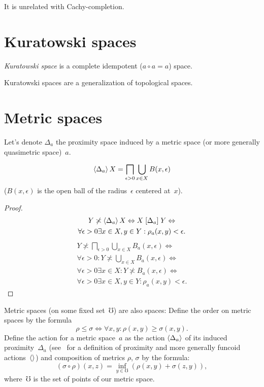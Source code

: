 \begin{note}
It is unrelated with Cachy-completion.
\end{note}

\chapter{Kuratowski spaces}

\begin{defn}
\emph{Kuratowski space} is a complete idempotent ($a\circ a=a$) space.
\end{defn}

Kuratowski spaces are a generalization of topological spaces.

\chapter{Metric spaces}

Let's denote $\Delta_a$ the proximity space induced by a metric space (or more generally quasimetric space)~$a$.

\begin{thm}
\[ \left\langle \Delta_a\right\rangle X = \bigsqcap_{\epsilon>0}\bigcup_{x\in X}B(x,\epsilon) \]
($B(x,\epsilon)$ is the open ball of the radius~$\epsilon$ centered at~$x$).
\end{thm}

\begin{proof}
\begin{multline*}
Y\not\asymp\left\langle \Delta_a\right\rangle X\Leftrightarrow X\mathrel{\left[\Delta_a\right]}Y \Leftrightarrow \\ \forall\epsilon>0\exists x\in X,y\in Y:\rho_a(x,y)<\epsilon.
\end{multline*}
\begin{multline*}
Y\nasymp\bigsqcap_{\epsilon>0}\bigcup_{x\in X}B_a(x,\epsilon) \Leftrightarrow \\ \forall\epsilon>0:Y\nasymp\bigcup_{x\in X}B_a(x,\epsilon) \Leftrightarrow \\
\forall\epsilon>0\exists x\in X:Y\nasymp B_a(x,\epsilon) \Leftrightarrow \\
\forall\epsilon>0\exists x\in X,y\in Y:\rho_a(x,y)<\epsilon.
\end{multline*}
\end{proof}


Metric spaces (on some fixed set~$\mho$) are also spaces: Define the order on metric spaces by the formula \[ \rho\leq\sigma \Leftrightarrow \forall x,y:\rho(x,y)\geq\sigma(x,y). \] Define the action for a metric space~$a$ as the action $\left\langle \Delta_a\right\rangle$ of its induced proximity~$\Delta_a$ (see~\cite{volume-1} for a definition of proximity and more generally funcoid actions~$\left\langle \right\rangle$) and composition of metrics $\rho$, $\sigma$ by the formula: \[ (\sigma\circ\rho)(x,z) = \inf_{y\in\mho}(\rho(x,y)+\sigma(z,y)), \]
where~$\mho$ is the set of points of our metric space.

